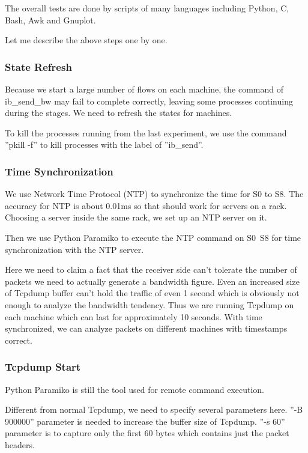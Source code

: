\documentclass[12pt,a4paper]{article}
\begin{document}
The overall tests are done by scripts of many languages including Python, C, Bash, Awk and Gnuplot.

Let me describe the above steps one by one.

\subsubsection{State Refresh}

Because we start a large number of flows on each machine, the command of ib\_send\_bw may fail to complete correctly, leaving
some processes continuing during the stages. We need to refresh the states for machines.

To kill the processes running from the last experiment, we use the command ''pkill -f'' to kill processes with the label of ''ib\_send''.

\subsubsection{Time Synchronization}
We use Network Time Protocol (NTP) to synchronize the time for S0 to S8.
The accuracy for NTP is about 0.01ms so that should work for servers on a rack.
Choosing a server inside the same rack, we set up an NTP server on it.

Then we use Python Paramiko to execute the NTP command on S0~S8 for time synchronization with the NTP server.

Here we need to claim a fact that the receiver side can't tolerate the number of packets we need to actually generate a bandwidth figure.
Even an increased size of Tcpdump buffer can't hold the traffic of even 1 second which is obviously not enough to analyze the bandwidth tendency.
Thus we are running Tcpdump on each machine which can last for approximately 10 seconds.
With time synchronized, we can analyze packets on different machines with timestamps correct.

\subsubsection{Tcpdump Start}
Python Paramiko is still the tool used for remote command execution.

Different from normal Tcpdump, we need to specify several parameters here.
''-B 900000'' parameter is needed to increase the buffer size of Tcpdump.
''-s 60'' parameter is to capture only the first 60 bytes which contains just the packet headers.
\end{document}
